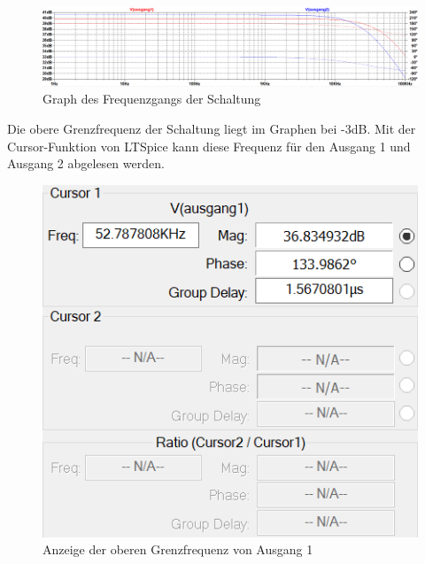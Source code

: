  \begin{figure}[h!]
                \centering
                \includegraphics[width=1\linewidth]{frequenz.PNG}
                \caption{Graph des Frequenzgangs der Schaltung}
                \label{fig:frequenz}
            \end{figure}
Die obere Grenzfrequenz der Schaltung liegt im Graphen bei -3dB. Mit der Cursor-Funktion von LTSpice kann diese Frequenz für den Ausgang 1 und Ausgang 2 abgelesen werden.
  \begin{figure}[ht!]
            \begin{minipage}[c]{0.45\textwidth}
                \includegraphics[width=0.9\linewidth]{cursor1.PNG}
                \caption{Anzeige der oberen Grenzfrequenz von Ausgang 1}
                \label{fig:cursor1}
            \end{minipage}
            \begin{minipage}[c]{0.45\textwidth}

\end{minipage}
\end{figure}
